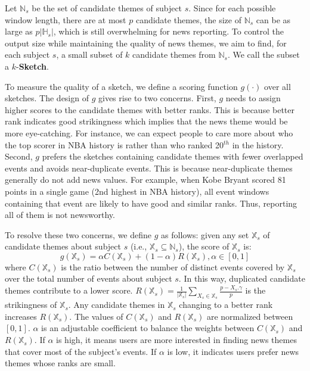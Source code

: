 Let $\mathbb{N}_s$ be the set of candidate themes of subject $s$. Since for each possible window length, there are at most $p$ candidate themes, the size of $\mathbb{N}_s$ can be as large as $p|\mathbb{H}_s|$, which is still overwhelming for news reporting.
To control the output size while maintaining the quality of news themes, we
aim to find, for each subject $s$, a small subset of $k$ 
candidate themes from $\mathbb{N}_s$. %
We call the subset  a $k$-\textbf{Sketch}. 

To measure the quality of a sketch, we define a scoring 
function $g(\cdot)$ over all sketches. The design of $g$ gives rise to two concerns.
First, $g$ needs to assign higher scores to the candidate themes with better ranks. This
is because better rank indicates good strikingness which implies that the news theme would
be more eye-catching. For instance, 
we can expect people to care more about who the top scorer in NBA history is rather than who ranked 20$^{th}$ in the history.
Second, $g$ prefers the sketches containing candidate themes with fewer overlapped events and avoids near-duplicate events. 
This is because near-duplicate themes generally do not add news values.
For example, when Kobe Bryant scored 81 points in a single game (2nd highest in NBA history),
all event windows containing that event are likely to have good and similar ranks. 
Thus, reporting all of them is not newsworthy.

To resolve these two concerns, we define $g$ as follows: given any set $\mathbb{X}_s$
of candidate themes about subject $s$ (i.e., $\mathbb{X}_s \subseteq \mathbb{N}_s$), 
the score of $\mathbb{X}_s $ is:
\begin{equation}
	\label{eq:scoring_function}
	g (\mathbb{X}_s) = \alpha C(\mathbb{X}_s) + (1-\alpha) R(\mathbb{X}_s), \alpha \in [0,1]
\end{equation}
where $C(\mathbb{X}_s)$ is the ratio between the number of distinct events covered by $\mathbb{X}_s$ 
over the total number of events about subject $s$. In this way, duplicated candidate themes 
contribute to a lower score. $R(\mathbb{X}_s) = \frac{1}{|\mathbb{X}_s|}\sum_{X_s \in \mathbb{X}_s} \frac{p-X_s.\gamma}{p}$ is the strikingness of $\mathbb{X}_s$. Any candidate themes in 
$\mathbb{X}_s$ changing to a better rank increases $R(\mathbb{X}_s)$. The values of $C(\mathbb{X}_s)$ and $R(\mathbb{X}_s)$ are normalized  between $[0,1]$. $\alpha$ is an adjustable coefficient to balance the weights between $C(\mathbb{X}_s)$ and $R(\mathbb{X}_s)$. If $\alpha$ is high, it means users are more interested in finding news themes that cover most of the subject's events.  If $\alpha$ is low, it indicates users prefer news themes whose ranks are small. 

